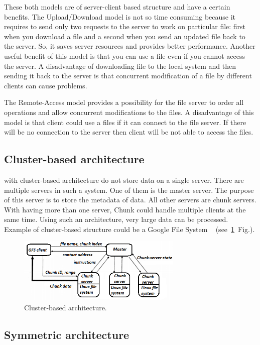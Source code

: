 \documentclass[a4paper,12pt,fleqn]{article}
\begin{document}
These both models are of server-client based structure and have a certain benefits. The Upload/Download model is not so time consuming because it requires to send only two requests to the server to work on particular file: first when you download a file and a second when you send an updated file back to the server. So, it saves server resources and provides better performance. Another useful benefit of this model is that you can use a file even if you cannot access the server. A disadvantage of downloading file to the local system and then sending it back to the server is that concurrent modification of a file by different clients can cause problems.

The Remote-Access model provides a possibility for the file server to order all operations and allow concurrent modifications to the files. A disadvantage of this model is that client could use a files if it can connect to the file server. If there will be no connection to the server then client will be not able to access the files.

\subsection{Cluster-based architecture}
 with cluster-based architecture do not store data on a single server. There are multiple servers in such a system. One of them is the master server. The purpose of this server is to store the metadata of data. All other servers are chunk servers. With having more than one server, Chunk could handle multiple clients at the same time. Using such an architecture, very large data can be processed. Example of cluster-based structure could be a Google File System ~\cite{levy1990distributed} (see\ \ref{pav03}~Fig.).
\begin{figure}[ht!]
    \centering
    \includegraphics[clip=true, width=0.7\textwidth]{Clustered-based_architecture.PNG}
    \caption{Cluster-based architecture.}
    \label{pav03}
\end{figure}

\subsection{Symmetric architecture}
\end{document}
